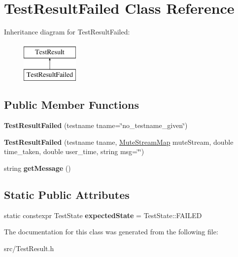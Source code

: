 \hypertarget{class_test_result_failed}{\section{Test\-Result\-Failed Class Reference}
\label{class_test_result_failed}
}
Inheritance diagram for Test\-Result\-Failed\-:\begin{figure}[H]
\begin{center}
\leavevmode
\includegraphics[height=2.000000cm]{class_test_result_failed}
\end{center}
\end{figure}
\subsection*{Public Member Functions}
\begin{DoxyCompactItemize}
\item 
\hypertarget{class_test_result_failed_a0dfba68857885687c1444616a4442a60}{{\bfseries Test\-Result\-Failed} (testname tname=\char`\"{}no\-\_\-testname\-\_\-given\char`\"{})}\label{class_test_result_failed_a0dfba68857885687c1444616a4442a60}

\item 
\hypertarget{class_test_result_failed_a4058cab0e31b182eb104eabaebe8f683}{{\bfseries Test\-Result\-Failed} (testname tname, \hyperlink{class_mute_stream_map}{Mute\-Stream\-Map} mute\-Stream, double time\-\_\-taken, double user\-\_\-time, string msg=\char`\"{}\char`\"{})}\label{class_test_result_failed_a4058cab0e31b182eb104eabaebe8f683}

\item 
\hypertarget{class_test_result_failed_acb780b8a76df6b5e478ce026d3c0ecec}{string {\bfseries get\-Message} ()}\label{class_test_result_failed_acb780b8a76df6b5e478ce026d3c0ecec}

\end{DoxyCompactItemize}
\subsection*{Static Public Attributes}
\begin{DoxyCompactItemize}
\item 
\hypertarget{class_test_result_failed_af1db849298ef78f74e9f4ce67a4e73b5}{static constexpr Test\-State {\bfseries expected\-State} = Test\-State\-::\-F\-A\-I\-L\-E\-D}\label{class_test_result_failed_af1db849298ef78f74e9f4ce67a4e73b5}

\end{DoxyCompactItemize}


The documentation for this class was generated from the following file\-:\begin{DoxyCompactItemize}
\item 
src/Test\-Result.\-h\end{DoxyCompactItemize}
